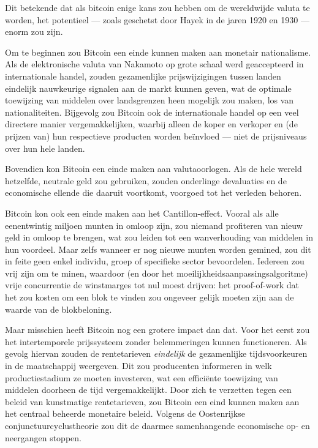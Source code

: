 \documentclass[smalldemyvopaper,11pt,twoside,onecolumn,openright,extrafontsizes,hidelinks]{memoir}
\begin{document}
Dit betekende dat als bitcoin enige kans zou hebben om de wereldwijde
valuta te worden, het potentieel --- zoals geschetst door Hayek in de
jaren 1920 en 1930 --- enorm zou zijn.

Om te beginnen zou Bitcoin een einde kunnen maken aan monetair
nationalisme. Als de elektronische valuta van Nakamoto op grote schaal
werd geaccepteerd in internationale handel, zouden gezamenlijke
prijswijzigingen tussen landen eindelijk nauwkeurige signalen aan de
markt kunnen geven, wat de optimale toewijzing van middelen over
landsgrenzen heen mogelijk zou maken, los van nationaliteiten. Bijgevolg
zou Bitcoin ook de internationale handel op een veel directere manier
vergemakkelijken, waarbij alleen de koper en verkoper en (de prijzen
van) hun respectieve producten worden beïnvloed --- niet de prijsniveaus
over hun hele landen.

Bovendien kon Bitcoin een einde maken aan valutaoorlogen. Als de hele
wereld hetzelfde, neutrale geld zou gebruiken, zouden onderlinge
devaluaties en de economische ellende die daaruit voortkomt, voorgoed
tot het verleden behoren.

Bitcoin kon ook een einde maken aan het Cantillon-effect. Vooral als
alle eenentwintig miljoen munten in omloop zijn, zou niemand profiteren
van nieuw geld in omloop te brengen, wat zou leiden tot een
wanverhouding van middelen in hun voordeel. Maar zelfs wanneer er nog
nieuwe munten worden gemined, zou dit in feite geen enkel individu,
groep of specifieke sector bevoordelen. Iedereen zou vrij zijn om te
minen, waardoor (en door het moeilijkheidsaanpassingsalgoritme) vrije
concurrentie de winstmarges tot nul moest drijven: het proof-of-work dat
het zou kosten om een blok te vinden zou ongeveer gelijk moeten zijn aan
de waarde van de blokbeloning.

Maar misschien heeft Bitcoin nog een grotere impact dan dat. Voor het
eerst zou het intertemporele prijssysteem zonder belemmeringen kunnen
functioneren. Als gevolg hiervan zouden de rentetarieven
\emph{eindelijk} de gezamenlijke tijdsvoorkeuren in de maatschappij
weergeven. Dit zou producenten informeren in welk productiestadium ze
moeten investeren, wat een efficiënte toewijzing van middelen doorheen
de tijd vergemakkelijkt. Door zich te verzetten tegen een beleid van
kunstmatige rentetarieven, zou Bitcoin een eind kunnen maken aan het
centraal beheerde monetaire beleid. Volgens de Oostenrijkse
conjunctuurcyclustheorie zou dit de daarmee samenhangende economische
op- en neergangen stoppen.
\end{document}
